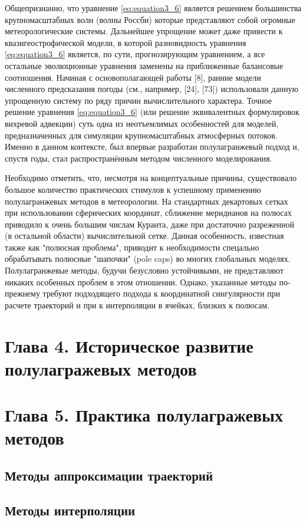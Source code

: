 Общепризнанно, что уравнение \eqref{eq:equation3_6} является решением большинства крупномасштабных волн (волны Россби) которые представляют собой огромные метеорологические системы. Дальнейшее упрощение может даже привести к квазигеострофической модели, в которой разновидность уравнения \eqref{eq:equation3_6} является, по сути, прогнозирующим уравнением, а все остальные эволюционные уравнения заменены на приближенные балансовые соотношения. Начиная с основополагающей работы [8], ранние модели численного предсказания погоды (см., например, [24], [73]) использовали данную упрощенную систему по ряду причин вычислительного характера. Точное решение уравнения \eqref{eq:equation3_6} (или решение эквивалентных формулировок вихревой адвекции) суть одна из неотъемлимых особенностей для моделей, предназначенных для симуляции крупномасштабных атмосферных потоков. Именно в данном контексте, был впервые разработан полулагранжевый подход и, спустя годы, стал распространённым методом численного моделирования. 

Необходимо отметить, что, несмотря на концептуальные причины, существовало большое количество практических стимулов к успешному применению полулагранжевых методов в метеорологии. На стандартных декартовых сетках при использовании сферических координат, сближение меридианов на полюсах приводило к очень большим числам Куранта, даже при достаточно разреженной (в остальной области) вычислительной сетке. Данная особенность, известная также как "полюсная проблема", приводит к необходимости спецально обрабатывать полюсные "шапочки" (pole caps) во многих глобальных моделях. Полулагранжевые методы, будучи безусловно устойчивыми, не представляют никаких особенных проблем в этом отношении. Однако, указанные методы по-прежнему требуют подходящего подхода к координатной сингулярности при расчете траекторий и при к интерполяции в ячейках, близких к полюсам.
\chapter*{Глава 4. Историческое развитие полулагражевых методов} \label{chapt_4}
\chapter*{Глава 5. Практика полулагражевых методов} \label{chapt_5}
\section*{Методы аппроксимации траекторий} \label{sect5_1}
\section*{Методы интерполяции} \label{sect5_2}

